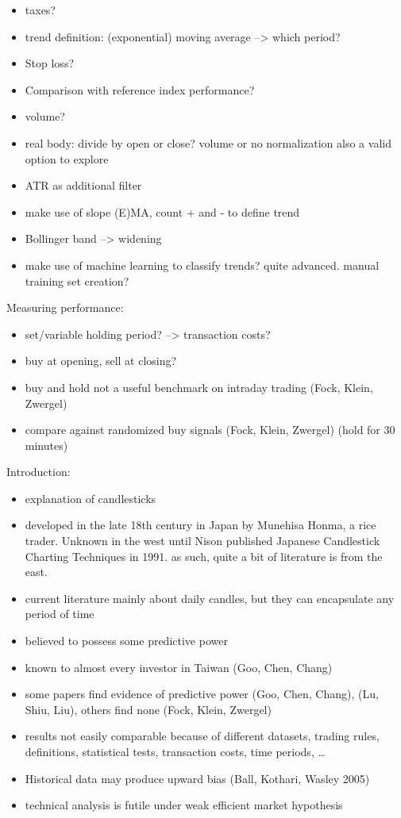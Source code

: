 \documentclass[
  12pt,
  a4paper,
  oneside]{book}
\begin{document}
\begin{itemize}
\item
  taxes?
\item
  trend definition: (exponential) moving average --\textgreater{} which period?
\item
  Stop loss?
\item
  Comparison with reference index performance?
\item
  volume?
\item
  real body: divide by open or close? volume or no normalization also a valid option to explore
\item
  ATR as additional filter
\item
  make use of slope (E)MA, count + and - to define trend
\item
  Bollinger band --\textgreater{} widening
\item
  make use of machine learning to classify trends? quite advanced. manual training set creation?
\end{itemize}

Measuring performance:

\begin{itemize}
\item
  set/variable holding period? --\textgreater{} transaction costs?
\item
  buy at opening, sell at closing?
\item
  buy and hold not a useful benchmark on intraday trading (Fock, Klein, Zwergel)
\item
  compare against randomized buy signals (Fock, Klein, Zwergel) (hold for 30 minutes)
\end{itemize}

Introduction:

\begin{itemize}
\item
  explanation of candlesticks
\item
  developed in the late 18th century in Japan by Munehisa Honma, a rice trader. Unknown in the west until Nison published Japanese Candlestick Charting Techniques in 1991. as such, quite a bit of literature is from the east.
\item
  current literature mainly about daily candles, but they can encapsulate any period of time
\item
  believed to possess some predictive power
\item
  known to almost every investor in Taiwan (Goo, Chen, Chang)
\item
  some papers find evidence of predictive power (Goo, Chen, Chang), (Lu, Shiu, Liu), others find none (Fock, Klein, Zwergel)
\item
  results not easily comparable because of different datasets, trading rules, definitions, statistical tests, transaction costs, time periods, \ldots{}
\item
  Historical data may produce upward bias (Ball, Kothari, Wasley 2005)
\item
  technical analysis is futile under weak efficient market hypothesis
\end{itemize}
\end{document}

